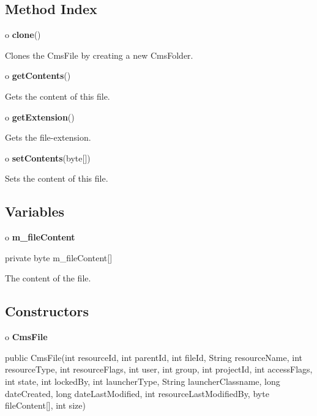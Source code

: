 \subsection*{  Method Index }

\begin{description}
\item o {\bf clone}()  

Clones the CmsFile by creating a new CmsFolder.  
\item o {\bf getContents}()  

Gets the content of this file.  
\item o {\bf getExtension}()  

Gets the file-extension.  
\item o {\bf setContents}(byte[])  

Sets the content of this file. 
\end{description}

\subsection*{  Variables }

o {\bf m\_fileContent} 

\begin{PRE}
 private byte m\_fileContent[]
\end{PRE}

\begin{description}
\htmlDD The content of the file.

\end{description}

\subsection*{  Constructors }

o {\bf CmsFile} 

\begin{PRE}
 public CmsFile(int resourceId,
                int parentId,
                int fileId,
                String resourceName,
                int resourceType,
                int resourceFlags,
                int user,
                int group,
                int projectId,
                int accessFlags,
                int state,
                int lockedBy,
                int launcherType,
                String launcherClassname,
                long dateCreated,
                long dateLastModified,
                int resourceLastModifiedBy,
                byte fileContent[],
                int size)
\end{PRE}

